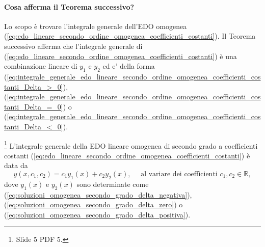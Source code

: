 \paragraph{Cosa afferma il Teorema successivo?} Lo scopo è trovare l'integrale generale dell'EDO omogenea (\ref{eq:edo_lineare_secondo_ordine_omogenea_coefficienti_costanti}). Il Teorema successivo afferma che l'integrale generale di (\ref{eq:edo_lineare_secondo_ordine_omogenea_coefficienti_costanti}) è una combinazione lineare di $y_1$ e $y_2$ ed e' della forma (\ref{eq:integrale_generale_edo_lineare_secondo_ordine_omogenea_coefficienti_costanti_Delta_>_0}), (\ref{eq:integrale_generale_edo_lineare_secondo_ordine_omogenea_coefficienti_costanti_Delta_=_0}) o (\ref{eq:integrale_generale_edo_lineare_secondo_ordine_omogenea_coefficienti_costanti_Delta_<_0}). 

\begin{theorem}\footnote{Slide 5 PDF 5.}
	L'integrale generale della EDO lineare omogenea di secondo grado a coefficienti costanti (\ref{eq:edo_lineare_secondo_ordine_omogenea_coefficienti_costanti}) è data da
	\begin{equation}\label{eq:integrale_generale_edo_lineare_secondo_ordine_omogenea_coefficienti_costanti}
		y(x,c_1,c_2) = c_1y_1(x) + c_2y_2(x),\quad \text{ al variare dei coefficienti } c_1,c_2\in\mathbb{R},
	\end{equation}
	dove $y_1(x)$ e $y_2(x)$ sono determinate come (\ref{eq:soluzioni_omogenea_secondo_grado_delta_negativa}), (\ref{eq:soluzioni_omogenea_secondo_grado_delta_zero}) o  (\ref{eq:soluzioni_omogenea_secondo_grado_delta_positiva}).
\end{theorem}
